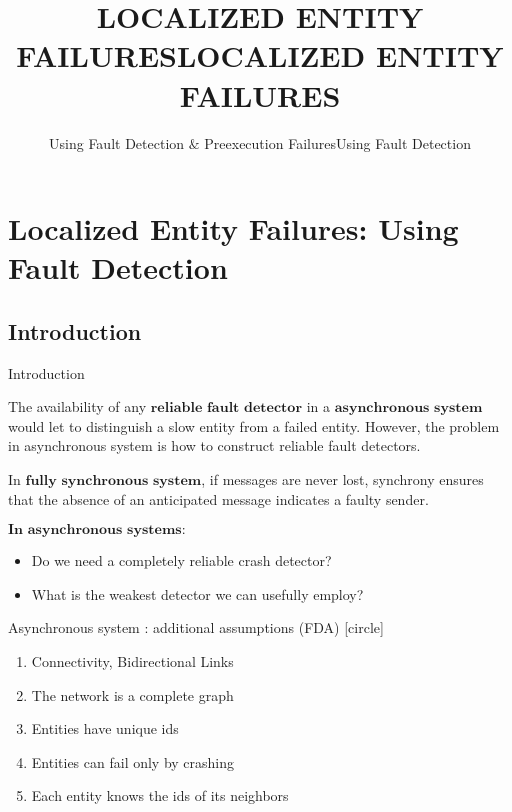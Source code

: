 \documentclass{beamer}
\title[Bani Gabriele 5719258]{LOCALIZED ENTITY FAILURES}
\subtitle[]{Using Fault Detection $\&$ Preexecution Failures}
\author[Sistemi Distribuiti $\&$ Reti di Calcolatori (2014/2015)] {}
\date[Bani Gabriele] {}
\begin{document}
\begin{frame}
  \titlepage
\end{frame}

\title[Bani Gabriele 5719258]{LOCALIZED ENTITY FAILURES}
\subtitle[]{Using Fault Detection}

\section{Localized Entity Failures: Using Fault Detection}

\begin{frame}
\titlepage
\end{frame}

\subsection{Introduction}
\begin{frame}{Introduction}
\begin{flushleft}
The availability of any $\textbf{reliable fault detector}$ in a $\textbf{asynchronous system}$ would let to distinguish a slow entity from a failed entity. However, the problem in asynchronous system is how to construct reliable fault detectors.
\end{flushleft}
\begin{flushleft}
In $\textbf{fully synchronous system}$, if messages are never lost, synchrony ensures that the absence of an anticipated message indicates a faulty sender.
\end{flushleft}
$\textbf{In asynchronous systems:}$
\begin{itemize}
\item Do we need a completely reliable crash detector?
\item What is the weakest detector we can usefully employ?
\end{itemize}
\end{frame}

\begin{frame}{Asynchronous system : additional assumptions (FDA)}
[circle]
\begin{enumerate}
\item Connectivity, Bidirectional Links
\begin{flushleft}
\end{flushleft}
\item The network is a complete graph
\begin{flushleft}
\end{flushleft}
\item Entities have unique ids
\begin{flushleft}
\end{flushleft}
\item Entities can fail only by crashing
\begin{flushleft}
\end{flushleft}
\item Each entity knows the ids of its neighbors
\end{enumerate}
\end{frame}
\end{document}
